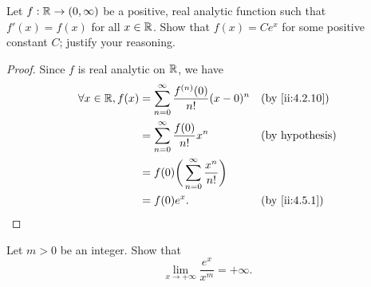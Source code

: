 \begin{ex}\label{ii:ex:4.5.7}
  Let \(f : \mathbb{R} \to (0, \infty)\) be a positive, real analytic function such that \(f'(x) = f(x)\) for all \(x \in \mathbb{R}\).
  Show that \(f(x) = C e^x\) for some positive constant \(C\);
  justify your reasoning.
\end{ex}

\begin{proof}
  Since \(f\) is real analytic on \(\mathbb{R}\), we have
  \begin{align*}
    \forall x \in \R, f(x) & = \sum_{n = 0}^\infty \dfrac{f^{(n)}(0)}{n!} (x - 0)^n &  & \by{ii:4.2.10}         \\
                           & = \sum_{n = 0}^\infty \dfrac{f(0)}{n!} x^n             &  & \text{(by hypothesis)} \\
                           & = f(0) \bigg(\sum_{n = 0}^\infty \dfrac{x^n}{n!}\bigg)                             \\
                           & = f(0) e^x.                                            &  & \by{ii:4.5.1}
  \end{align*}
\end{proof}

\begin{ex}\label{ii:ex:4.5.8}
  Let \(m > 0\) be an integer.
  Show that
  \[
    \lim_{x \to +\infty} \dfrac{e^x}{x^m} = +\infty.
  \]
\end{ex}


